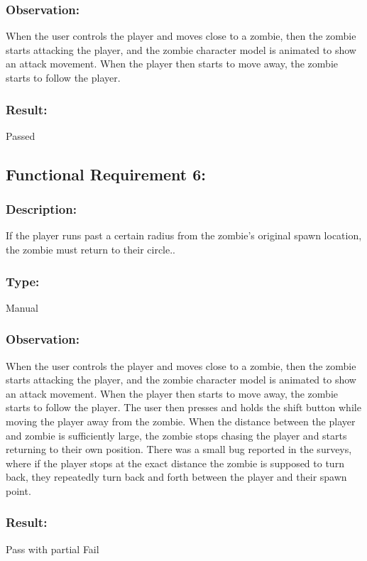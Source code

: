 \documentclass[12pt, titlepage]{article}
\begin{document}
\subsubsection{Observation: } When the user controls the player and moves close to a zombie, then the zombie starts attacking the player, and the zombie character model is animated to show an attack movement. When the player then starts to move away, the zombie starts to follow the player.

\subsubsection[Pass / Fail:] {Result: } Passed


\subsection{Functional Requirement 6: } 

\subsubsection{Description: }If the player runs past a certain radius from the zombie's original spawn location, the zombie must return to their circle..

\subsubsection{Type: } Manual

\subsubsection{Observation: } When the user controls the player and moves close to a zombie, then the zombie starts attacking the player, and the zombie character model is animated to show an attack movement. When the player then starts to move away, the zombie starts to follow the player. The user then presses and holds the shift button while moving the player away from the zombie. When the distance between the player and zombie is sufficiently large, the zombie stops chasing the player and starts returning to their own position. There was a small bug reported in the surveys, where if the player stops at the exact distance the zombie is supposed to turn back, they repeatedly turn back and forth between the player and their spawn point.

\subsubsection[Pass / Fail:] {Result: } Pass with partial Fail
\end{document}
